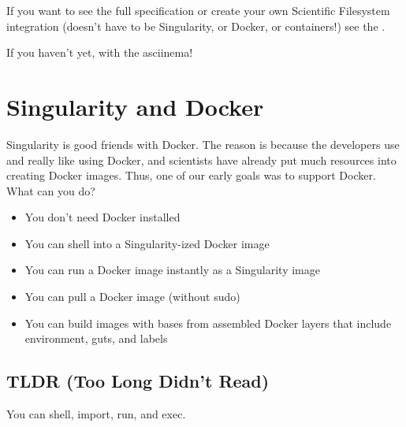 \documentclass[letterpaper,10pt,english]{sphinxmanual}
\begin{document}
If you want to see the full specification or create your own
Scientific Filesystem integration (doesn’t have to be Singularity, or
Docker, or containers!) see the .

If you haven’t yet,  with the
asciinema!


\chapter{Singularity and Docker}
\label{\detokenize{singularity_and_docker:singularity-and-docker}}\label{\detokenize{singularity_and_docker::doc}}
Singularity is good friends with Docker. The reason is because the
developers use and really like using Docker, and scientists have already
put much resources into creating Docker images. Thus, one of our early
goals was to support Docker. What can you do?
\begin{itemize}
\item {} 
You don’t need Docker installed

\item {} 
You can shell into a Singularity-ized Docker image

\item {} 
You can run a Docker image instantly as a Singularity image

\item {} 
You can pull a Docker image (without sudo)

\item {} 
You can build images with bases from assembled Docker layers that
include environment, guts, and labels

\end{itemize}


\section{TLDR (Too Long Didn’t Read)}
\label{\detokenize{singularity_and_docker:tldr-too-long-didnt-read}}
You can shell, import, run, and exec.

%
\begin{sphinxVerbatim}[commandchars=\\\{\}]
  

  

    


  

   
\end{sphinxVerbatim}
\end{document}
